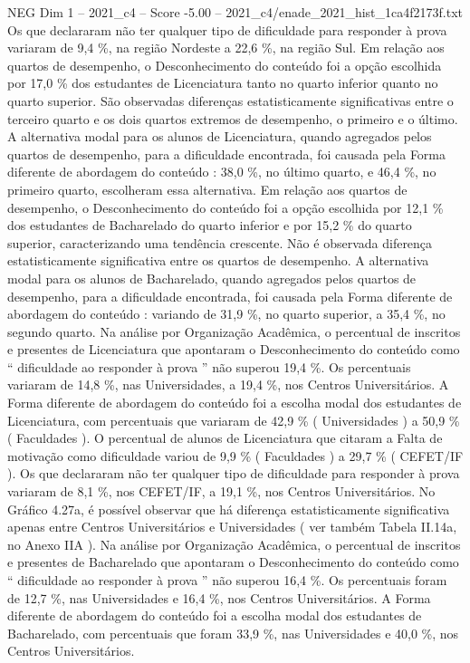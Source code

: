\begin{textsample}{NEG Dim 1 – 2021\_c4 – Score -5.00 – 2021\_c4/enade\_2021\_hist\_1ca4f2173f.txt}
Os que declararam não ter qualquer tipo de dificuldade para responder à prova variaram de 9,4 \%, na região Nordeste a 22,6 \%, na região Sul.
Em relação aos quartos de desempenho, o Desconhecimento do conteúdo foi a opção escolhida por 17,0 \% dos estudantes de Licenciatura tanto no quarto inferior quanto no quarto superior.
São observadas diferenças estatisticamente significativas entre o terceiro quarto e os dois quartos extremos de desempenho, o primeiro e o último.
A alternativa modal para os alunos de Licenciatura, quando agregados pelos quartos de desempenho, para a dificuldade encontrada, foi causada pela Forma diferente de abordagem do conteúdo : 38,0 \%, no último quarto, e 46,4 \%, no primeiro quarto, escolheram essa alternativa.
Em relação aos quartos de desempenho, o Desconhecimento do conteúdo foi a opção escolhida por 12,1 \% dos estudantes de Bacharelado do quarto inferior e por 15,2 \% do quarto superior, caracterizando uma tendência crescente.
Não é observada diferença estatisticamente significativa entre os quartos de desempenho.
A alternativa modal para os alunos de Bacharelado, quando agregados pelos quartos de desempenho, para a dificuldade encontrada, foi causada pela Forma diferente de abordagem do conteúdo : variando de 31,9 \%, no quarto superior, a 35,4 \%, no segundo quarto.
Na análise por Organização Acadêmica, o percentual de inscritos e presentes de Licenciatura que apontaram o Desconhecimento do conteúdo como “ dificuldade ao responder à prova ” não superou 19,4 \%.
Os percentuais variaram de 14,8 \%, nas Universidades, a 19,4 \%, nos Centros Universitários.
A Forma diferente de abordagem do conteúdo foi a escolha modal dos estudantes de Licenciatura, com percentuais que variaram de 42,9 \% ( Universidades ) a 50,9 \% ( Faculdades ).
O percentual de alunos de Licenciatura que citaram a Falta de motivação como dificuldade variou de 9,9 \% ( Faculdades ) a 29,7 \% ( CEFET/IF ).
Os que declararam não ter qualquer tipo de dificuldade para responder à prova variaram de 8,1 \%, nos CEFET/IF, a 19,1 \%, nos Centros Universitários.
No Gráfico 4.27a, é possível observar que há diferença estatisticamente significativa apenas entre Centros Universitários e Universidades ( ver também Tabela II.14a, no Anexo IIA ).
Na análise por Organização Acadêmica, o percentual de inscritos e presentes de Bacharelado que apontaram o Desconhecimento do conteúdo como “ dificuldade ao responder à prova ” não superou 16,4 \%.
Os percentuais foram de 12,7 \%, nas Universidades e 16,4 \%, nos Centros Universitários.
A Forma diferente de abordagem do conteúdo foi a escolha modal dos estudantes de Bacharelado, com percentuais que foram 33,9 \%, nas Universidades e 40,0 \%, nos Centros Universitários.

\end{textsample}
